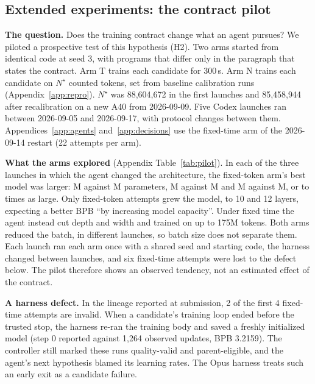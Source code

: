 \documentclass{article}
\newif\ifshowhumanmarkers \showhumanmarkersfalse
\newcommand{\humantag}[1]{{\color{humanframe}\sffamily\scriptsize\bfseries HUMAN AUTHOR MUST REWRITE/VERIFY [#1]}\ }
\newcommand{\humanauthor}[2][]{\ifshowhumanmarkers\begin{humanbox}\humantag{#1}#2\end{humanbox}\else #2\par\fi}
\begin{document}
\subsection{Extended experiments: the contract pilot}\label{sec:pilot}
\humanauthor[P2-15 r6]{ \textbf{The question.} Does the training contract change what an agent pursues? We piloted a prospective test of this hypothesis (H2). Two arms started from identical code at seed 3, with programs that differ only in the paragraph that states the contract. Arm T trains each candidate for 300\,s. Arm N trains each candidate on $N^\star$ counted tokens, set from baseline calibration runs (Appendix~\ref{app:repro}). $N^\star$ was 88,604,672 in the first launches and 85,458,944 after recalibration on a new A40 from \mbox{2026-09-09}. Five Codex launches ran between 2026-09-05 and 2026-09-17, with protocol changes between them. Appendices~\ref{app:agents} and~\ref{app:decisions} use the fixed-time arm of the 2026-09-14 restart (22 attempts per arm).

\looseness=-1 \textbf{What the arms explored} (Appendix Table~\ref{tab:pilot}). In each of the three launches in which the agent changed the architecture, the fixed-token arm's best model was larger: \CRFivePilotNA M against \CRFivePilotTA M parameters, \CRFivePilotNB M against \CRFivePilotTB M and \CRFivePilotNC M against \CRFivePilotTC M, or \CRFivePilotRatioLo{} to \CRFivePilotRatioHi{} times as large. Only fixed-token attempts grew the model, to 10 and 12 layers, expecting a better BPB ``by increasing model capacity''. Under fixed time the agent instead cut depth and width and trained on up to 175M tokens. Both arms reduced the batch, in different launches, so batch size does not separate them. Each launch ran each arm once with a shared seed and starting code, the harness changed between launches, and six fixed-time attempts were lost to the defect below. The pilot therefore shows an observed tendency, not an estimated effect of the contract.

\looseness=-1 \textbf{A harness defect.} In the lineage reported at submission, 2 of the first 4 fixed-time attempts are invalid. When a candidate's training loop ended before the trusted stop, the harness re-ran the training body and saved a freshly initialized model (step 0 reported against 1,264 observed updates, BPB 3.2159). The controller still marked these runs quality-valid and parent-eligible, and the agent's next hypothesis blamed its learning rates. The Opus harness treats such an early exit as a candidate failure.}
\end{document}
